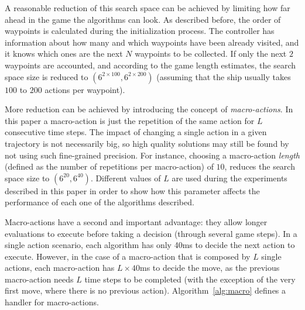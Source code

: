 \documentclass{sig-alternate}
\begin{document}
A reasonable reduction of this search space can be achieved by limiting how far ahead in the game the algorithms can look. As described before, the order of waypoints is calculated during the initialization process. The controller has information about how many and which waypoints have been already visited, and it knows which ones are the next $N$ waypoints to be collected. If only the next $2$ waypoints are accounted, and according to the game length estimates, the search space size is reduced to $(6^{2 \times 100}, 6^{2 \times 200})$ (assuming that the ship usually takes $100$ to $200$ actions per waypoint).

More reduction can be achieved by introducing the concept of \textit{macro-actions}. In this paper a macro-action is just the repetition of the same action for $L$ consecutive time steps. The impact of changing a single action in a given trajectory is not necessarily big, so high quality solutions may still be found by not using such fine-grained precision. For instance, choosing a macro-action \textit{length} (defined as the number of repetitions per macro-action) of $10$, reduces the search space size to $(6^{20}, 6^{40})$. Different values of $L$ are used during the experiments described in this paper in order to show how this parameter affects the performance of each one of the algorithms described.

Macro-actions have a second and important advantage: they allow longer evaluations to execute before taking a decision (through several game steps). In a single action scenario, each algorithm has only 40ms to decide the next action to execute. However, in the case of a macro-action that is composed by $L$ single actions, each macro-action has $L \times 40$ms to decide the move, as the previous macro-action needs $L$ time steps to be completed (with the exception of the very first move, where there is no previous action). Algorithm~\ref{alg:macro} defines a handler for macro-actions. 
\end{document}
